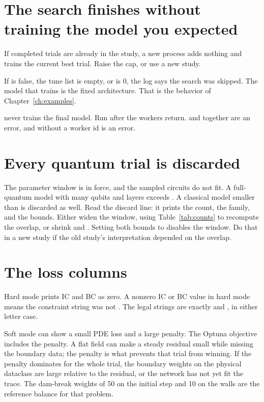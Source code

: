 \section{The search finishes without training the model you expected}

If  completed trials are already in the study, a new process adds nothing and trains the current best trial.
Raise the cap, or use a new study.

If  is false, the tune list is empty, or  is 0, the log says the search was skipped.
The model that trains is the fixed  architecture.
That is the behavior of Chapter~\ref{ch:examples}.

 never trains the final model.
Run  after the workers return.
 and  together are an error, and  without a worker id is an error.

\section{Every quantum trial is discarded}

The parameter window is in force, and the sampled circuits do not fit.
A full-quantum model with many qubits and layers exceeds .
A classical model smaller than  is discarded as well.
Read the discard line: it prints the count, the family, and the bounds.
Either widen the window, using Table~\ref{tab:counts} to recompute the overlap, or shrink  and .
Setting both bounds to  disables the window.
Do that in a new study if the old study's interpretation depended on the overlap.

\section{The loss columns}

Hard mode prints IC and BC as zero.
A nonzero IC or BC value in hard mode means the constraint string was not .
The legal strings are exactly  and , in either letter case.

Soft mode can show a small PDE loss and a large penalty.
The Optuna objective includes the penalty.
A flat field can make a steady residual small while missing the boundary data; the penalty is what prevents that trial from winning.
If the penalty dominates for the whole trial, the boundary weights on the physical dataclass are large relative to the residual, or the network has not yet fit the trace.
The dam-break weights of 50 on the initial step and 10 on the walls are the reference balance for that problem.

